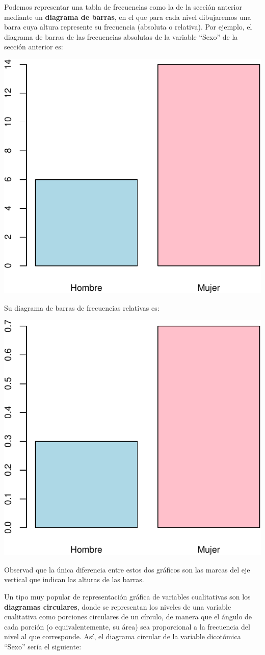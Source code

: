 \documentclass[
]{book}
\theoremstyle{definition}
\theoremstyle{definition}
\theoremstyle{definition}
\theoremstyle{definition}
\theoremstyle{remark}
\begin{document}
Podemos representar una tabla de frecuencias como la de la sección anterior mediante un \textbf{diagrama de barras}, en el que para cada nivel dibujaremos una barra cuya altura represente su frecuencia (absoluta o relativa). Por ejemplo, el diagrama de barras de las frecuencias absolutas de la variable ``Sexo'' de la sección anterior es:

\begin{center}\includegraphics[width=0.5\linewidth]{INREMDN_files/figure-latex/unnamed-chunk-207-1} \end{center}

Su diagrama de barras de frecuencias relativas es:

\begin{center}\includegraphics[width=0.5\linewidth]{INREMDN_files/figure-latex/unnamed-chunk-208-1} \end{center}

Observad que la única diferencia entre estos dos gráficos son las marcas del eje vertical que indican las alturas de las barras.

Un tipo muy popular de representación gráfica de variables cualitativas son los \textbf{diagramas circulares}, donde se representan los niveles de una variable cualitativa como porciones circulares de un círculo, de manera que el ángulo de cada porción (o equivalentemente, su área) sea proporcional a la frecuencia del nivel al que corresponde. Así, el diagrama circular de la variable dicotómica ``Sexo'' sería el siguiente:
\end{document}
